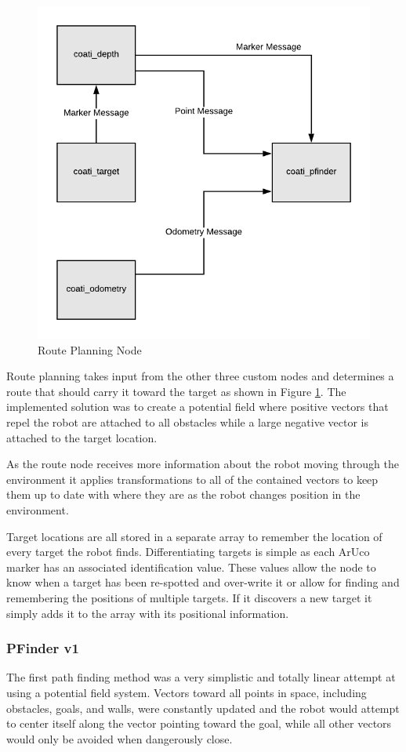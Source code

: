 \documentclass{article}[12]
\begin{document}
	\begin{figure}[H]
		\centering
		\includegraphics[width=0.6\linewidth]{PathFinderDiagram.png}
		\caption{Route Planning Node}
		\label{fig:routeplanning}
	\end{figure}

	Route planning takes input from the other three custom nodes and determines a route that should carry it toward the target as shown in Figure \ref{fig:routeplanning}. The implemented solution was to create a potential field where positive vectors that repel the robot are attached to all obstacles while a large negative vector is attached to the target location.
	
	As the route node receives more information about the robot moving through the environment it applies transformations to all of the contained vectors to keep them up to date with where they are as the robot changes position in the environment. 
	
 Target locations are all stored in a separate array to remember the location of every target the robot finds. Differentiating targets is simple as each ArUco marker has an associated identification value. These values allow the node to know when a target has been re-spotted and over-write it or allow for finding and remembering the positions of multiple targets. If it discovers a new target it simply adds it to the array with its positional information.
 
 	\subsubsection{PFinder v1}
 
 	The first path finding method was a very simplistic and totally linear attempt at using a potential field system. Vectors toward all points in space, including obstacles, goals, and walls, were constantly updated and the robot would attempt to center itself along the vector pointing toward the goal, while all other vectors would only be avoided when dangerously close.
 
\end{document}
